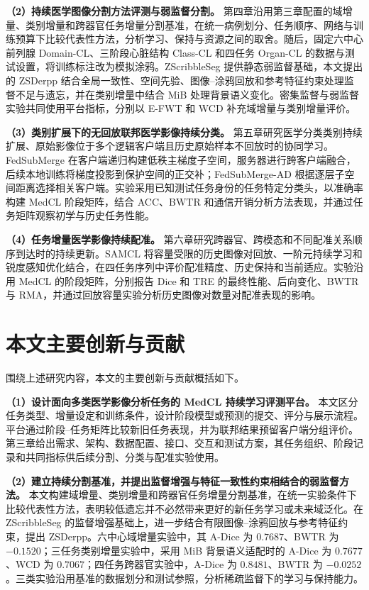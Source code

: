 \textbf{（2）持续医学图像分割方法评测与弱监督分割。}
第四章沿用第三章配置的域增量、类别增量和跨器官任务增量分割基准，在统一病例划分、任务顺序、网络与训练预算下比较代表性方法，分析学习、保持与资源之间的取舍\cite{wang2026benchmark}。随后，固定六中心前列腺 Domain-CL、三阶段心脏结构 Class-CL 和四任务 Organ-CL 的数据与测试设置，将训练标注改为模拟涂鸦。ZScribbleSeg 提供静态弱监督基础，本文提出的 ZSDerpp 结合全局一致性、空间先验、图像--涂鸦回放和参考特征约束处理监督不足与遗忘\cite{zhang2026zscribbleseg}，并在类别增量中结合 MiB 处理背景语义变化。密集监督与弱监督实验共同使用平台指标，分别以 E-FWT 和 WCD 补充域增量与类别增量评价。

\textbf{（3）类别扩展下的无回放联邦医学影像持续分类。}
第五章研究医学分类类别持续扩展、原始影像位于多个逻辑客户端且历史原始样本不回放时的协同学习。FedSubMerge 在客户端递归构建低秩主梯度子空间，服务器进行跨客户端融合，后续本地训练将梯度投影到保护空间的正交补；FedSubMerge-AD 根据逐层子空间距离选择相关客户端。实验采用已知测试任务身份的任务特定分类头，以准确率构建 MedCL 阶段矩阵，结合 ACC、BWTR 和通信开销分析方法表现，并通过任务矩阵观察初学与历史任务性能。

\textbf{（4）任务增量医学影像持续配准。}
第六章研究跨器官、跨模态和不同配准关系顺序到达时的持续更新。SAMCL 将容量受限的历史图像对回放、一阶元持续学习和锐度感知优化结合，在四任务序列中评价配准精度、历史保持和当前适应\cite{wang2024samcl}。实验沿用 MedCL 的阶段矩阵，分别报告 Dice 和 TRE 的最终性能、后向变化、BWTR 与 RMA，并通过回放容量实验分析历史图像对数量对配准表现的影响。

\section{本文主要创新与贡献}
\label{sec:intro-contributions}

围绕上述研究内容，本文的主要创新与贡献概括如下。

\textbf{（1）设计面向多类医学影像分析任务的 MedCL 持续学习评测平台。}
本文区分任务类型、增量设定和训练条件，设计阶段模型或预测的提交、评分与展示流程。平台通过阶段--任务矩阵比较新旧任务表现，并为联邦结果预留客户端分组评价。第三章给出需求、架构、数据配置、接口、交互和测试方案，其任务组织、阶段记录和共同指标供后续分割、分类与配准实验使用。

\textbf{（2）建立持续分割基准，并提出监督增强与特征一致性约束相结合的弱监督方法。}
本文构建域增量、类别增量和跨器官任务增量分割基准，在统一实验条件下比较代表性方法，表明较低遗忘并不必然带来更好的新任务学习或未来域泛化\cite{wang2026benchmark}。在 ZScribbleSeg 的监督增强基础上，进一步结合有限图像--涂鸦回放与参考特征约束，提出 ZSDerpp。六中心域增量实验中，其 A-Dice 为 $0.7687$、BWTR 为 $-0.1520$；三任务类别增量实验中，采用 MiB 背景语义适配时的 A-Dice 为 $0.7677$、WCD 为 $0.7067$；四任务跨器官实验中，A-Dice 为 $0.8481$、BWTR 为 $-0.0252$。三类实验沿用基准的数据划分和测试参照，分析稀疏监督下的学习与保持能力。

